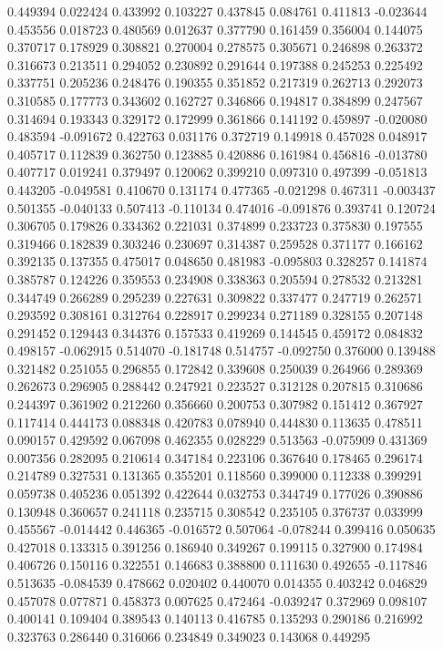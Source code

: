 0.449394
0.022424
0.433992
0.103227
0.437845
0.084761
0.411813
-0.023644
0.453556
0.018723
0.480569
0.012637
0.377790
0.161459
0.356004
0.144075
0.370717
0.178929
0.308821
0.270004
0.278575
0.305671
0.246898
0.263372
0.316673
0.213511
0.294052
0.230892
0.291644
0.197388
0.245253
0.225492
0.337751
0.205236
0.248476
0.190355
0.351852
0.217319
0.262713
0.292073
0.310585
0.177773
0.343602
0.162727
0.346866
0.194817
0.384899
0.247567
0.314694
0.193343
0.329172
0.172999
0.361866
0.141192
0.459897
-0.020080
0.483594
-0.091672
0.422763
0.031176
0.372719
0.149918
0.457028
0.048917
0.405717
0.112839
0.362750
0.123885
0.420886
0.161984
0.456816
-0.013780
0.407717
0.019241
0.379497
0.120062
0.399210
0.097310
0.497399
-0.051813
0.443205
-0.049581
0.410670
0.131174
0.477365
-0.021298
0.467311
-0.003437
0.501355
-0.040133
0.507413
-0.110134
0.474016
-0.091876
0.393741
0.120724
0.306705
0.179826
0.334362
0.221031
0.374899
0.233723
0.375830
0.197555
0.319466
0.182839
0.303246
0.230697
0.314387
0.259528
0.371177
0.166162
0.392135
0.137355
0.475017
0.048650
0.481983
-0.095803
0.328257
0.141874
0.385787
0.124226
0.359553
0.234908
0.338363
0.205594
0.278532
0.213281
0.344749
0.266289
0.295239
0.227631
0.309822
0.337477
0.247719
0.262571
0.293592
0.308161
0.312764
0.228917
0.299234
0.271189
0.328155
0.207148
0.291452
0.129443
0.344376
0.157533
0.419269
0.144545
0.459172
0.084832
0.498157
-0.062915
0.514070
-0.181748
0.514757
-0.092750
0.376000
0.139488
0.321482
0.251055
0.296855
0.172842
0.339608
0.250039
0.264966
0.289369
0.262673
0.296905
0.288442
0.247921
0.223527
0.312128
0.207815
0.310686
0.244397
0.361902
0.212260
0.356660
0.200753
0.307982
0.151412
0.367927
0.117414
0.444173
0.088348
0.420783
0.078940
0.444830
0.113635
0.478511
0.090157
0.429592
0.067098
0.462355
0.028229
0.513563
-0.075909
0.431369
0.007356
0.282095
0.210614
0.347184
0.223106
0.367640
0.178465
0.296174
0.214789
0.327531
0.131365
0.355201
0.118560
0.399000
0.112338
0.399291
0.059738
0.405236
0.051392
0.422644
0.032753
0.344749
0.177026
0.390886
0.130948
0.360657
0.241118
0.235715
0.308542
0.235105
0.376737
0.033999
0.455567
-0.014442
0.446365
-0.016572
0.507064
-0.078244
0.399416
0.050635
0.427018
0.133315
0.391256
0.186940
0.349267
0.199115
0.327900
0.174984
0.406726
0.150116
0.322551
0.146683
0.388800
0.111630
0.492655
-0.117846
0.513635
-0.084539
0.478662
0.020402
0.440070
0.014355
0.403242
0.046829
0.457078
0.077871
0.458373
0.007625
0.472464
-0.039247
0.372969
0.098107
0.400141
0.109404
0.389543
0.140113
0.416785
0.135293
0.290186
0.216992
0.323763
0.286440
0.316066
0.234849
0.349023
0.143068
0.449295
